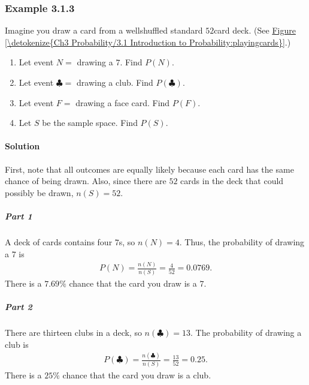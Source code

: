 \documentclass[letterpaper,10pt,english]{jupyterBook}
\begin{document}
\subsubsection{Example 3.1.3}
\label{\detokenize{Ch3 Probability/3.1 Introduction to Probability:example-3-1-3}}
\sphinxAtStartPar
Imagine you draw a card from a well\sphinxhyphen{}shuffled standard \(52\)\sphinxhyphen{}card deck. (See \hyperref[\detokenize{Ch3 Probability/3.1 Introduction to Probability:playingcards}]{Figure \ref{\detokenize{Ch3 Probability/3.1 Introduction to Probability:playingcards}}}.)
\begin{enumerate}
%
\item {} 
\sphinxAtStartPar
Let event \(N = \) drawing a \(7\). Find \(P(N)\).

\item {} 
\sphinxAtStartPar
Let event \(♣ = \) drawing a club. Find \(P(♣)\).

\item {} 
\sphinxAtStartPar
Let event \(F = \) drawing a face card. Find \(P(F)\).

\item {} 
\sphinxAtStartPar
Let \(S\) be the sample space. Find \(P(S)\).

\end{enumerate}


\paragraph{Solution}
\label{\detokenize{Ch3 Probability/3.1 Introduction to Probability:id6}}
\sphinxAtStartPar
First, note that all outcomes are equally likely because each card has the same chance of being drawn. Also, since there are \(52\) cards in the deck that could possibly be drawn, \(n(S) = 52\).


\subparagraph{Part 1}
\label{\detokenize{Ch3 Probability/3.1 Introduction to Probability:id7}}
\sphinxAtStartPar
A deck of cards contains four \(7\)s, so \(n(N) = 4\). Thus, the probability of drawing a \(7\) is
\begin{equation*}
\begin{split} P(N) = \frac{n(N)}{n(S)} = \frac{4}{52} = 0.0769. \end{split}
\end{equation*}
\sphinxAtStartPar
There is a \(7.69\%\) chance that the card you draw is a \(7\).


\subparagraph{Part 2}
\label{\detokenize{Ch3 Probability/3.1 Introduction to Probability:id8}}
\sphinxAtStartPar
There are thirteen clubs in a deck, so \(n(♣) = 13\). The probability of drawing a club is
\begin{equation*}
\begin{split} P(♣) = \frac{n(♣)}{n(S)} = \frac{13}{52} = 0.25. \end{split}
\end{equation*}
\sphinxAtStartPar
There is a \(25\%\) chance that the card you draw is a club.
\end{document}
